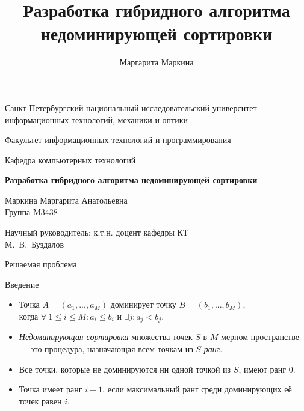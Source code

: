 \documentclass{beamer}
\title[Недоминирующая сортировка]{Разработка гибридного алгоритма недоминирующей сортировки}
\author[Маргарита Маркина]{Маргарита Маркина}
\institute[]{Национальный исследовательский университет информационных технологий, механики и оптики}
\date{}
\begin{document}
\begin{frame}
\begin{center}
{\scriptsize Санкт-Петербургский национальный исследовательский университет \\ информационных технологий, механики и оптики}

\vspace{1cm}

{\scriptsize Факультет информационных технологий и программирования

Кафедра компьютерных технологий}

\vspace{1cm}

\vbox{\large\bfseries
Разработка гибридного алгоритма недоминирующей сортировки}

\vspace{1cm}

{\large Маркина Маргарита Анатольевна \\}
{\large Группа M3438}


\vspace{1cm}

{\large Научный руководитель: к.т.н. доцент кафедры КТ \\}
{\large М.~B.~Буздалов}


\end{center}
\end{frame}


\begin{frame}{Решаемая проблема}
\begin{block}{Введение}
\begin{itemize}
\item Точка $A=(a_1,...,a_M)$ доминирует точку $B=(b_1,...,b_M)$, \\
когда $\forall ~ 1 \leq i \leq M : a_i \leq b_i$ и $\exists j : a_j < b_j $.
\item \textit{Недоминирующая сортировка} множества точек $S$ в $M$-мерном пространстве — это процедура, назначающая всем точкам из $S$ \textit{ранг}.
\item Все точки, которые не доминируются ни одной точкой из $S$, имеют ранг 0.
\item Точка имеет ранг $i+1$, если максимальный ранг среди доминирующих  её точек равен $i$.
\end{itemize}
\end{block}
\end{frame}
\end{document}
